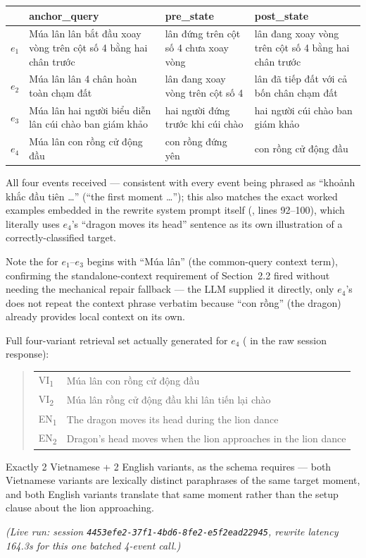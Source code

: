 \begin{center}
\small
\begin{tabular}{@{}p{}p{}p{}p{}@{}}
\toprule
& \textbf{anchor\_query} & \textbf{pre\_state} & \textbf{post\_state} \\
\midrule
$e_1$ & Múa lân lân bắt đầu xoay vòng trên cột số 4 bằng hai chân trước
 & lân đứng trên cột số 4 chưa xoay vòng
 & lân đang xoay vòng trên cột số 4 bằng hai chân trước \\
$e_2$ & Múa lân lân 4 chân hoàn toàn chạm đất
 & lân đang xoay vòng trên cột số 4
 & lân đã tiếp đất với cả bốn chân chạm đất \\
$e_3$ & Múa lân hai người biểu diễn lân cúi chào ban giám khảo
 & hai người đứng trước khi cúi chào
 & hai người cúi chào ban giám khảo \\
$e_4$ & Múa lân con rồng cử động đầu
 & con rồng đứng yên
 & con rồng cử động đầu \\
\bottomrule
\end{tabular}
\end{center}

\noindent All four events received  --- consistent
with every event being phrased as ``khoảnh khắc đầu tiên \dots'' (``the first
moment \dots''); this also matches the exact worked examples embedded in the
rewrite system prompt itself (, lines 92--100),
which literally uses $e_4$'s ``dragon moves its head'' sentence as its own
illustration of a correctly-classified  target.

Note the  for $e_1$--$e_3$ begins with ``Múa lân'' (the
common-query context term), confirming the standalone-context requirement of
Section~2.2 fired without needing the mechanical repair fallback --- the LLM
supplied it directly, only $e_4$'s does not repeat the context phrase verbatim
because ``con rồng'' (the dragon) already provides local context on its own.

Full four-variant retrieval set actually generated for $e_4$
( in the raw session response):
\begin{quote}\small
\begin{tabular}{@{}ll@{}}
VI\textsubscript{1} & Múa lân con rồng cử động đầu \\
VI\textsubscript{2} & Múa lân rồng cử động đầu khi lân tiến lại chào \\
EN\textsubscript{1} & The dragon moves its head during the lion dance \\
EN\textsubscript{2} & Dragon's head moves when the lion approaches in the lion dance \\
\end{tabular}
\end{quote}
Exactly 2 Vietnamese + 2 English variants, as the schema requires --- both
Vietnamese variants are lexically distinct paraphrases of the same target
moment, and both English variants translate that same moment rather than the
setup clause about the lion approaching.

\emph{(Live run: session \texttt{4453efe2-37f1-4bd6-8fe2-e5f2ead22945},
rewrite latency 164.3s for this one batched 4-event call.)}
